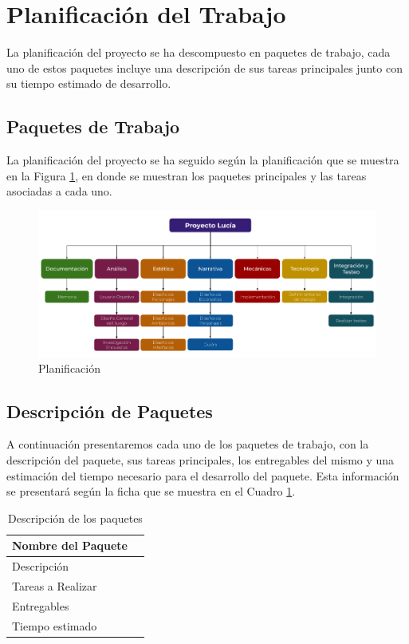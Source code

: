 
\section{Planificación del Trabajo}

La planificación del proyecto se ha descompuesto en paquetes de trabajo, cada uno de estos paquetes incluye una descripción de sus tareas principales junto con su tiempo estimado de desarrollo.

\subsection{Paquetes de Trabajo}

La planificación del proyecto se ha seguido según la planificación que se muestra en la Figura \ref{fig:paquetes}, en donde se muestran los paquetes principales y las tareas asociadas a cada uno.

\begin{figure}[h]
    \centering
    \includegraphics[width=\textwidth]{imgs/paquetes.png}
    \caption{Planificación}
    \label{fig:paquetes}
\end{figure}

\subsection{Descripción de Paquetes}
A continuación presentaremos cada uno de los paquetes de trabajo, con la descripción del paquete, sus tareas principales, los entregables del mismo y una estimación del tiempo necesario para el desarrollo del paquete. Esta información se presentará según la ficha que se muestra en el Cuadro \ref{tab:paquete}.

\begin{table}[h!]
    \centering
    \begin{tabular}{|l|p{10cm}|}
        \hline
        \rowcolor{Gray}
        \textbf{Nombre del Paquete} &  \\
        \hline
        Descripción & \\
        \hline
        Tareas a Realizar & \\
        \hline
        Entregables & \\
        \hline
        Tiempo estimado & \\
        \hline
    \end{tabular}
    \caption{Descripción de los paquetes}
    \label{tab:paquete}
\end{table}

